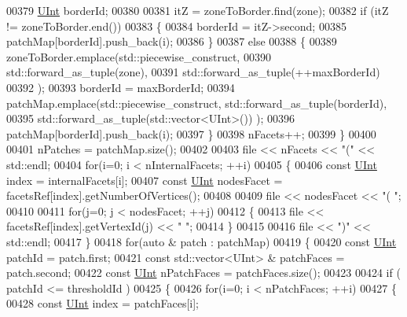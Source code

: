 \begin{DoxyCode}
00379         \hyperlink{namespaceFVCode3D_a4bf7e328c75d0fd504050d040ebe9eda}{UInt} borderId;
00380 
00381         itZ = zoneToBorder.find(zone);
00382         \textcolor{keywordflow}{if} (itZ != zoneToBorder.end())
00383         \{
00384             borderId = itZ->second;
00385             patchMap[borderId].push\_back(i);
00386         \}
00387         \textcolor{keywordflow}{else}
00388         \{
00389             zoneToBorder.emplace(std::piecewise\_construct,
00390                                  std::forward\_as\_tuple(zone),
00391                                  std::forward\_as\_tuple(++maxBorderId)
00392                                 );
00393             borderId = maxBorderId;
00394             patchMap.emplace(std::piecewise\_construct, std::forward\_as\_tuple(borderId),
00395                              std::forward\_as\_tuple(std::vector<UInt>()) );
00396             patchMap[borderId].push\_back(i);
00397         \}
00398         nFacets++;
00399     \}
00400 
00401     nPatches = patchMap.size();
00402 
00403     file << nFacets << \textcolor{stringliteral}{"("} << std::endl;
00404     \textcolor{keywordflow}{for}(i=0; i < nInternalFacets; ++i)
00405     \{
00406         \textcolor{keyword}{const} \hyperlink{namespaceFVCode3D_a4bf7e328c75d0fd504050d040ebe9eda}{UInt} index = internalFacets[i];
00407         \textcolor{keyword}{const} \hyperlink{namespaceFVCode3D_a4bf7e328c75d0fd504050d040ebe9eda}{UInt} nodesFacet = facetsRef[index].getNumberOfVertices();
00408 
00409         file << nodesFacet << \textcolor{stringliteral}{"( "};
00410 
00411         \textcolor{keywordflow}{for}(j=0; j < nodesFacet; ++j)
00412         \{
00413             file << facetsRef[index].getVertexId(j) << \textcolor{stringliteral}{" "};
00414         \}
00415 
00416         file << \textcolor{stringliteral}{")"} << std::endl;
00417     \}
00418     \textcolor{keywordflow}{for}(\textcolor{keyword}{auto} & patch : patchMap)
00419     \{
00420         \textcolor{keyword}{const} \hyperlink{namespaceFVCode3D_a4bf7e328c75d0fd504050d040ebe9eda}{UInt} patchId = patch.first;
00421         \textcolor{keyword}{const} std::vector<UInt> & patchFaces = patch.second;
00422         \textcolor{keyword}{const} \hyperlink{namespaceFVCode3D_a4bf7e328c75d0fd504050d040ebe9eda}{UInt} nPatchFaces = patchFaces.size();
00423 
00424         \textcolor{keywordflow}{if} ( patchId <= thresholdId )
00425         \{
00426             \textcolor{keywordflow}{for}(i=0; i < nPatchFaces; ++i)
00427             \{
00428                 \textcolor{keyword}{const} \hyperlink{namespaceFVCode3D_a4bf7e328c75d0fd504050d040ebe9eda}{UInt} index = patchFaces[i];

\end{DoxyCode}
